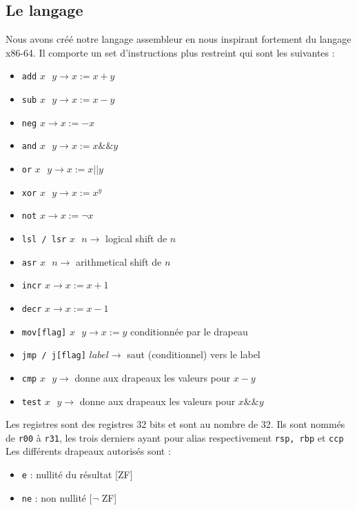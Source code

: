 \documentclass[10pt,a4paper,notitlepage ]{report}
\begin{document}
\subsection{Le langage}
	\par{Nous avons créé notre langage assembleur en nous inspirant fortement du langage x86-64. Il comporte un set d'instructions plus restreint qui sont les suivantes :
	\begin{itemize}
		\item \texttt{add} $x \text{ } y \rightarrow x := x + y$
		\item \texttt{sub} $x \text{ } y \rightarrow x := x - y$
		\item \texttt{neg} $x \rightarrow x := - x $
		\item \texttt{and} $x \text{ } y \rightarrow x := x \&\& y$
		\item \texttt{or} $x \text{ } y \rightarrow x := x || y$
		\item \texttt{xor} $x \text{ } y \rightarrow x := x ^ y$
		\item \texttt{not} $x \rightarrow x := \neg x$
		\item \texttt{lsl / lsr} $x \text{ } n \rightarrow $ logical shift de $n$
		\item \texttt{asr} $x \text{ } n \rightarrow $ arithmetical shift de $n$
		\item \texttt{incr} $x \rightarrow x := x + 1$
		\item \texttt{decr} $x \rightarrow x := x - 1$
		\item \texttt{mov[flag]} $x \text{ } y \rightarrow x := y$ conditionnée par le drapeau
		\item \texttt{jmp / j[flag]} $label \rightarrow $ saut (conditionnel) vers le label
		\item \texttt{cmp} $x \text{ } y \rightarrow $ donne aux drapeaux les valeurs pour $x - y$
		\item \texttt{test} $x \text{ } y \rightarrow $ donne aux drapeaux les valeurs pour $x \&\& y$
	\end{itemize}
	Les registres sont des registres 32 bits et sont au nombre de 32. Ils sont nommés de \texttt{r00} à \texttt{r31}, les trois derniers ayant pour alias respectivement \texttt{rsp, rbp} et \texttt{ccp}\\
	Les différents drapeaux autorisés sont :
	\begin{itemize}
		\item \texttt{e} : nullité du résultat [ZF]
		\item \texttt{ne} : non nullité [$\neg$ ZF]

\end{itemize}}
\end{document}
